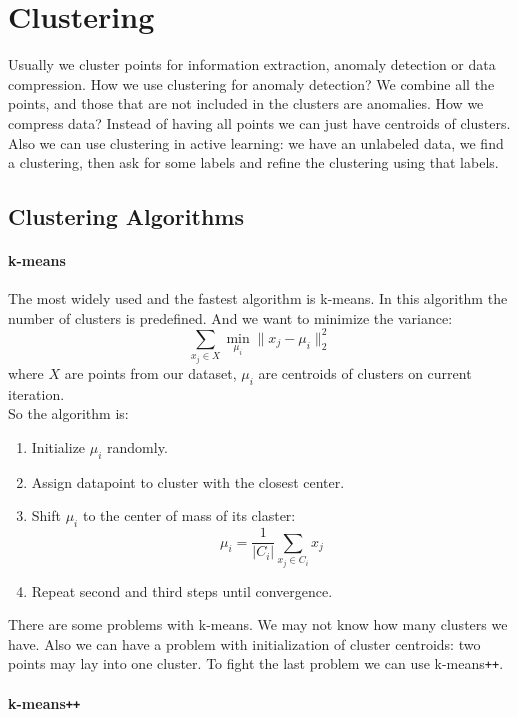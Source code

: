 \chapter{Clustering}

{\sf Usually we cluster points for information extraction, anomaly detection or data compression. How we use clustering for anomaly detection? We combine all the points, and those that are not included in the clusters are anomalies. How we compress data? Instead of having all points we can just have centroids of clusters. Also we can use clustering in active learning: we have an unlabeled data, we find a clustering, then ask for some labels and refine the clustering using that labels.}

\section{Clustering Algorithms}
\vspace{-0.6cm}
\subsubsection*{k-means}

The most widely used and the fastest algorithm is k-means. In this algorithm the number of clusters is predefined. And we want to minimize the variance:
$$\sum\limits_{x_j\in X}\min\limits_{\mu_i}\|x_j-\mu_i\|_2^2$$
where $X$ are points from our dataset, $\mu_i$ are centroids of clusters on current iteration. \\
So the algorithm is:
\begin{enumerate}
	\item Initialize $\mu_i$ randomly.
	\item Assign datapoint to cluster with the closest center.
	\item Shift $\mu_i$ to the center of mass of its claster: $$\mu_i=\frac{1}{|C_i|}\sum\limits_{x_j\in C_i}x_j$$
	\item Repeat second and third steps until convergence.
\end{enumerate} 
There are some problems with k-means. We may not know how many clusters we have. Also we can have a problem with initialization of cluster centroids: two points may lay into one cluster. To fight the last problem we can use k-means\texttt{++}.

\subsubsection*{k-means\texttt{++}}

